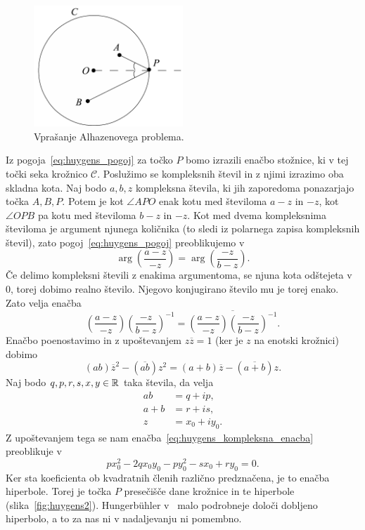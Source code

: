 \begin{figure}[h]
    \centering
    \includegraphics[width=0.5\textwidth]{images/alhazen/huygens1.png}
    \caption[Nastavek Huygensovega reševanja]{Vprašanje Alhazenovega problema.}
    \label{fig:huygens1}
\end{figure}

Iz pogoja~\ref{eq:huygens_pogoj} za točko $P$ bomo izrazili enačbo stožnice, ki v tej točki seka krožnico $\mathcal{C}$. Poslužimo se kompleksnih števil in z njimi izrazimo oba skladna kota. Naj bodo $a, b, z$ kompleksna števila, ki jih zaporedoma ponazarjajo točka $A, B, P$. Potem je kot $\angle APO$ enak kotu med številoma $a-z$ in $-z$, kot $\angle OPB$ pa kotu med številoma $b-z$ in $-z$. Kot med dvema kompleksnima številoma je argument njunega količnika (to sledi iz polarnega zapisa kompleksnih števil), zato pogoj~\ref{eq:huygens_pogoj} preoblikujemo v
$$ \arg \left(\frac{a-z}{-z}\right) = \arg \left(\frac{-z}{b-z}\right). $$
Če delimo kompleksni števili z enakima argumentoma, se njuna kota odštejeta v $0$, torej dobimo realno število. Njegovo konjugirano število mu je torej enako. Zato velja enačba
\begin{equation*}
    \left(\frac{a-z}{-z}\right) \left(\frac{-z}{b-z}\right)^{-1} = \overline{\left(\frac{a-z}{-z}\right) \left(\frac{-z}{b-z}\right)^{-1}}.
\end{equation*}
Enačbo poenostavimo in z upoštevanjem $z \overline{z} = 1$ (ker je $z$ na enotski krožnici) dobimo
\begin{equation}
    \label{eq:huygens_kompleksna_enacba}
    (ab) \overline{z}^2 - (\overline{ab}) z^2 = (a+b) \overline{z} - (\overline{a+b}) z.
\end{equation}
Naj bodo $q, p, r, s, x, y \in \mathbb R$ taka števila, da velja
\begin{align*}
    ab &= q + i p, \\
    a + b &= r + i s, \\
    z &= x_0 + i y_0.
\end{align*}
Z upoštevanjem tega se nam enačba~\ref{eq:huygens_kompleksna_enacba} preoblikuje v
\begin{equation*}
    px_0^2 -2qx_0y_0 -py_0^2 - sx_0 + ry_0 = 0.
\end{equation*}
Ker sta koeficienta ob kvadratnih členih različno predznačena, je to enačba hiperbole. Torej je točka $P$ presečišče dane krožnice in te hiperbole (slika~\ref{fig:huygens2}). Hungerbühler v~\cite{hungerbuhler1992} malo podrobneje določi dobljeno hiperbolo, a to za nas ni v nadaljevanju ni pomembno. 


